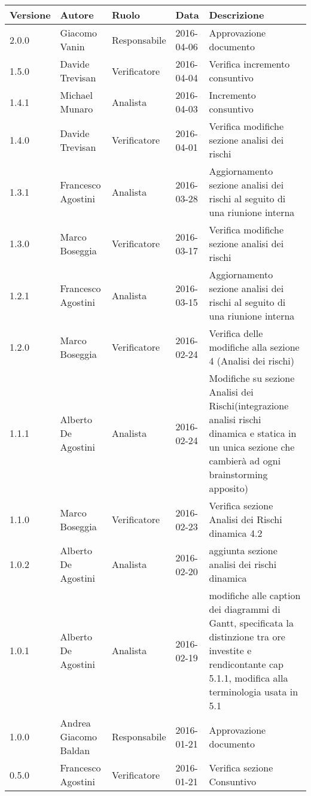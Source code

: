 \documentclass{scalatekids-article}
\begin{document}
\begin{center}
  \begin{longtable}{| l | l | l | l | p{5cm} |}
    \hline
    Versione & Autore & Ruolo & Data & Descrizione \\
    \hline
    2.0.0 & Giacomo Vanin & Responsabile & 2016-04-06 & Approvazione documento\\
    \hline
    1.5.0 & Davide Trevisan & Verificatore & 2016-04-04 & Verifica incremento consuntivo\\
    \hline
    1.4.1 & Michael Munaro & Analista & 2016-04-03 & Incremento consuntivo\\
    \hline
    1.4.0 & Davide Trevisan & Verificatore & 2016-04-01 & Verifica modifiche sezione analisi dei rischi\\
    \hline
    1.3.1 & Francesco Agostini & Analista & 2016-03-28 & Aggiornamento sezione analisi dei rischi al seguito di una riunione interna\\ 
    \hline
    1.3.0 & Marco Boseggia & Verificatore & 2016-03-17 & Verifica modifiche sezione analisi dei rischi\\
    \hline
    1.2.1 & Francesco Agostini & Analista & 2016-03-15 & Aggiornamento sezione analisi dei rischi al seguito di una riunione interna\\
    \hline
    1.2.0 & Marco Boseggia & Verificatore & 2016-02-24 & Verifica delle modifiche alla sezione 4 (Analisi dei rischi)\\
    \hline
    1.1.1 & Alberto De Agostini & Analista & 2016-02-24 & Modifiche su sezione Analisi dei Rischi(integrazione analisi rischi dinamica e statica in un unica sezione che cambierà ad ogni brainstorming apposito)\\
    \hline
    1.1.0 & Marco Boseggia & Verificatore & 2016-02-23 & Verifica sezione Analisi dei Rischi dinamica 4.2\\
    \hline
    1.0.2 & Alberto De Agostini & Analista & 2016-02-20 & aggiunta sezione analisi dei rischi dinamica\\
    \hline
    1.0.1 & Alberto De Agostini & Analista & 2016-02-19 & modifiche alle caption dei diagrammi di Gantt, specificata la distinzione tra ore investite e rendicontante cap 5.1.1, modifica alla terminologia usata in 5.1\\
    \hline
    1.0.0 & Andrea Giacomo Baldan & Responsabile & 2016-01-21 & Approvazione documento\\
    \hline
    0.5.0 & Francesco Agostini & Verificatore & 2016-01-21 & Verifica sezione Consuntivo\\

\end{longtable}
\end{center}
\end{document}
